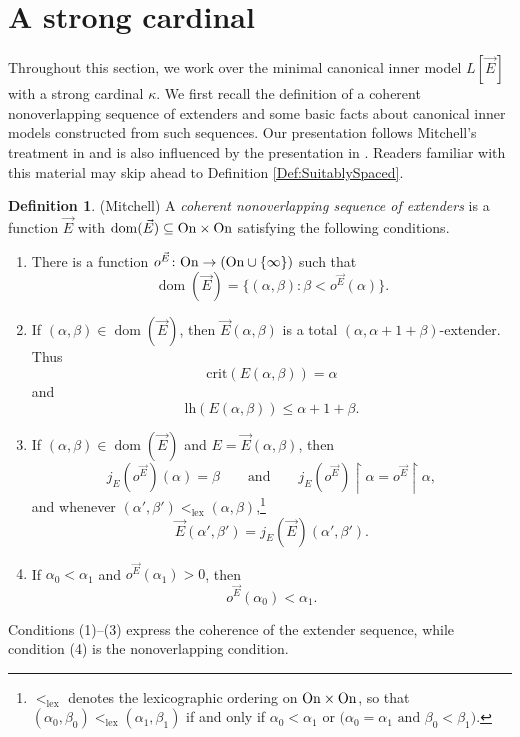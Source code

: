 \documentclass{article}
\theoremstyle{definition}
\newtheorem{definition}{Definition}[section]
\theoremstyle{plain}
\DeclareMathOperator{\dom}{dom}
\begin{document}
\section{A strong cardinal}\label{Sec:Strong}

Throughout this section, we work over the minimal canonical inner model $L[\vec{E}]$ with a strong cardinal $\kappa$. We first recall the definition of a coherent nonoverlapping sequence of extenders and some basic facts about canonical inner models constructed from such sequences. Our presentation follows Mitchell's treatment in \cite{MitchellInnerModel} and is also influenced by the presentation in \cite{aptercummings2023normalmeasuresonlargecards}. Readers familiar with this material may skip ahead to Definition \ref{Def:SuitablySpaced}.

\begin{definition}(Mitchell)
A \textit{{coherent nonoverlapping sequence of extenders}} is a function
$\vec E$ with $\dom(\vec E)\subseteq {\rm On}\times{\rm On}$
satisfying the following conditions.


\begin{enumerate}
    \item There is a function
    $o^{\vec E}\colon {\rm On} \to ({\rm On}\cup \{ \infty \})$ such that
    $$    \dom(\vec E)  =   \{(\alpha,\beta)\colon \beta<o^{\vec E}(\alpha)\}. $$

    \item If $(\alpha,\beta)\in\dom(\vec E)$, then
    $\vec E(\alpha,\beta)$ is a total $(\alpha,\alpha+1+\beta)$-extender. Thus
    $$\text{crit}(E(\alpha,\beta))=\alpha$$
    and 
    $$\text{lh}(E(\alpha,\beta))\leq\alpha+1+\beta.$$
    \item If $(\alpha,\beta)\in \dom(\vec E)$ and
    $E=\vec E(\alpha,\beta)$, then
    $$
    j_E(o^{\vec E})(\alpha)=\beta
    \qquad\text{and}\qquad
    j_E(o^{\vec E})\restriction\alpha
    =
    o^{\vec E}\restriction\alpha,
    $$
    and whenever
    $(\alpha',\beta')<_{\text{lex}}(\alpha,\beta)$,\footnote{$<_{\text{lex}}$ denotes the lexicographic ordering on ${\rm On}\times{\rm On}$, so that
    $(\alpha_0,\beta_0)<_{\text{lex}}(\alpha_1,\beta_1)$ if and only if $\alpha_0<\alpha_1$ or $\bigl(\alpha_0=\alpha_1\text{ and }\beta_0<\beta_1\bigr)$.}
    $$\vec E(\alpha',\beta')  =  j_E(\vec E)(\alpha',\beta').$$

    \item If $\alpha_0<\alpha_1$ and
    $o^{\vec E}(\alpha_1)>0$, then
    $$    o^{\vec E}(\alpha_0)<\alpha_1.$$

    
    
\end{enumerate}

Conditions (1)--(3) express the coherence of the extender sequence,
while condition (4) is the nonoverlapping condition.
\end{definition}
\end{document}
